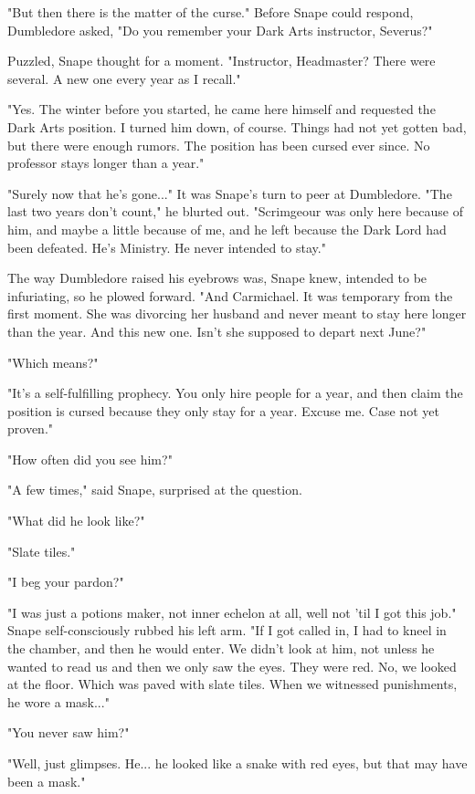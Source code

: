 \documentclass[a4paper,11pt]{article}
\begin{document}
"But then there is the matter of the curse." Before Snape could respond, Dumbledore asked, "Do you remember your Dark Arts instructor, Severus?"

Puzzled, Snape thought for a moment. "Instructor, Headmaster? There were several. A new one every year as I recall."

"Yes. The winter before you started, he came here himself and requested the Dark Arts position. I turned him down, of course. Things had not yet gotten bad, but there were enough rumors. The position has been cursed ever since. No professor stays longer than a year."

"Surely now that he's gone..." It was Snape's turn to peer at Dumbledore. "The last two years don't count," he blurted out. "Scrimgeour was only here because of him, and maybe a little because of me, and he left because the Dark Lord had been defeated. He's Ministry. He never intended to stay."

The way Dumbledore raised his eyebrows was, Snape knew, intended to be infuriating, so he plowed forward. "And Carmichael. It was temporary from the first moment. She was divorcing her husband and never meant to stay here longer than the year. And this new one. Isn't she supposed to depart next June?"

"Which means?"

"It's a self-fulfilling prophecy. You only hire people for a year, and then claim the position is cursed because they only stay for a year. Excuse me. Case not yet proven."

"How often did you see him?"

"A few times," said Snape, surprised at the question.

"What did he look like?"

"Slate tiles."

"I beg your pardon?"

"I was just a potions maker, not inner echelon at all, well not 'til I got this job." Snape self-consciously rubbed his left arm. "If I got called in, I had to kneel in the chamber, and then he would enter. We didn't look at him, not unless he wanted to read us and then we only saw the eyes. They were red. No, we looked at the floor. Which was paved with slate tiles. When we witnessed punishments, he wore a mask..."

"You never saw him?"

"Well, just glimpses. He... he looked like a snake with red eyes, but that may have been a mask."
\end{document}

